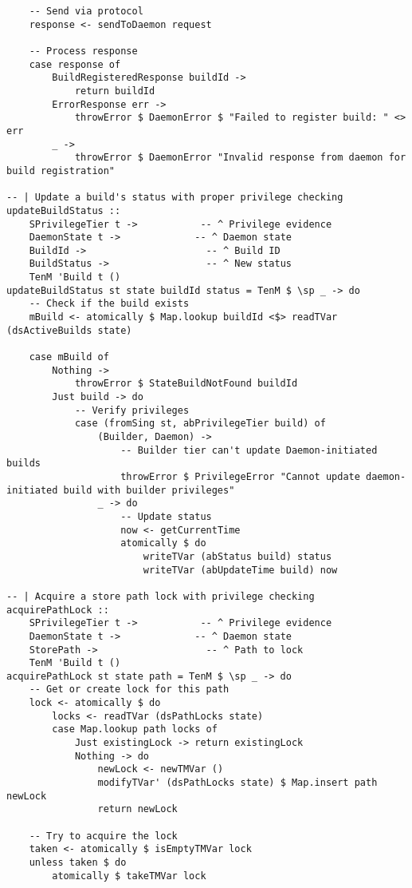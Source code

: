 \documentclass{article}
\begin{document}
\begin{tcolorbox}[title=Ten/Daemon/State.hs Changes]
\begin{verbatim}
    -- Send via protocol
    response <- sendToDaemon request

    -- Process response
    case response of
        BuildRegisteredResponse buildId ->
            return buildId
        ErrorResponse err ->
            throwError $ DaemonError $ "Failed to register build: " <> err
        _ ->
            throwError $ DaemonError "Invalid response from daemon for build registration"

-- | Update a build's status with proper privilege checking
updateBuildStatus ::
    SPrivilegeTier t ->           -- ^ Privilege evidence
    DaemonState t ->             -- ^ Daemon state
    BuildId ->                     -- ^ Build ID
    BuildStatus ->                 -- ^ New status
    TenM 'Build t ()
updateBuildStatus st state buildId status = TenM $ \sp _ -> do
    -- Check if the build exists
    mBuild <- atomically $ Map.lookup buildId <$> readTVar (dsActiveBuilds state)

    case mBuild of
        Nothing ->
            throwError $ StateBuildNotFound buildId
        Just build -> do
            -- Verify privileges
            case (fromSing st, abPrivilegeTier build) of
                (Builder, Daemon) ->
                    -- Builder tier can't update Daemon-initiated builds
                    throwError $ PrivilegeError "Cannot update daemon-initiated build with builder privileges"
                _ -> do
                    -- Update status
                    now <- getCurrentTime
                    atomically $ do
                        writeTVar (abStatus build) status
                        writeTVar (abUpdateTime build) now

-- | Acquire a store path lock with privilege checking
acquirePathLock ::
    SPrivilegeTier t ->           -- ^ Privilege evidence
    DaemonState t ->             -- ^ Daemon state
    StorePath ->                   -- ^ Path to lock
    TenM 'Build t ()
acquirePathLock st state path = TenM $ \sp _ -> do
    -- Get or create lock for this path
    lock <- atomically $ do
        locks <- readTVar (dsPathLocks state)
        case Map.lookup path locks of
            Just existingLock -> return existingLock
            Nothing -> do
                newLock <- newTMVar ()
                modifyTVar' (dsPathLocks state) $ Map.insert path newLock
                return newLock

    -- Try to acquire the lock
    taken <- atomically $ isEmptyTMVar lock
    unless taken $ do
        atomically $ takeTMVar lock


\end{verbatim}
\end{tcolorbox}
\end{document}
